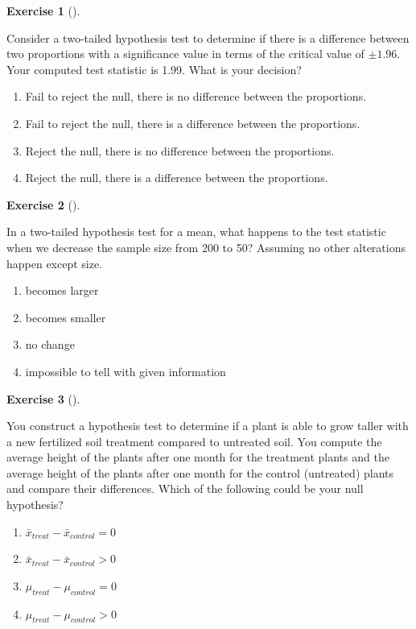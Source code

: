 \documentclass[
  letterpaper,
  DIV=11,
  numbers=noendperiod]{scrreprt}
\providecommand{\tightlist}{%
  \setlength{\itemsep}{0pt}\setlength{\parskip}{0pt}}\usepackage{longtable,booktabs,array}
\theoremstyle{definition}
\newtheorem{exercise}{Exercise}[chapter]
\theoremstyle{remark}
\begin{document}
\begin{exercise}[]\protect\hypertarget{exr-ch12-c07}{}\label{exr-ch12-c07}

Consider a two-tailed hypothesis test to determine if there is a
difference between two proportions with a significance value in terms of
the critical value of \(\pm 1.96\). Your computed test statistic is
1.99. What is your decision?

\begin{enumerate}
\def\labelenumi{\alph{enumi})}
\tightlist
\item
  Fail to reject the null, there is no difference between the
  proportions.
\item
  Fail to reject the null, there is a difference between the
  proportions.
\item
  Reject the null, there is no difference between the proportions.
\item
  Reject the null, there is a difference between the proportions.
\end{enumerate}

\end{exercise}

\begin{exercise}[]\protect\hypertarget{exr-ch12-c08}{}\label{exr-ch12-c08}

In a two-tailed hypothesis test for a mean, what happens to the test
statistic when we decrease the sample size from 200 to 50? Assuming no
other alterations happen except size.

\begin{enumerate}
\def\labelenumi{\alph{enumi})}
\tightlist
\item
  becomes larger
\item
  becomes smaller
\item
  no change
\item
  impossible to tell with given information
\end{enumerate}

\end{exercise}

\begin{exercise}[]\protect\hypertarget{exr-ch12-c09}{}\label{exr-ch12-c09}

You construct a hypothesis test to determine if a plant is able to grow
taller with a new fertilized soil treatment compared to untreated soil.
You compute the average height of the plants after one month for the
treatment plants and the average height of the plants after one month
for the control (untreated) plants and compare their differences. Which
of the following could be your null hypothesis?

\begin{enumerate}
\def\labelenumi{\alph{enumi})}
\tightlist
\item
  \(\bar{x}_{treat} - \bar{x}_{control} = 0\)
\item
  \(\bar{x}_{treat} - \bar{x}_{control} > 0\)
\item
  \(\mu_{treat} - \mu_{control} = 0\)
\item
  \(\mu_{treat} - \mu_{control} >0\)
\end{enumerate}

\end{exercise}
\end{document}

